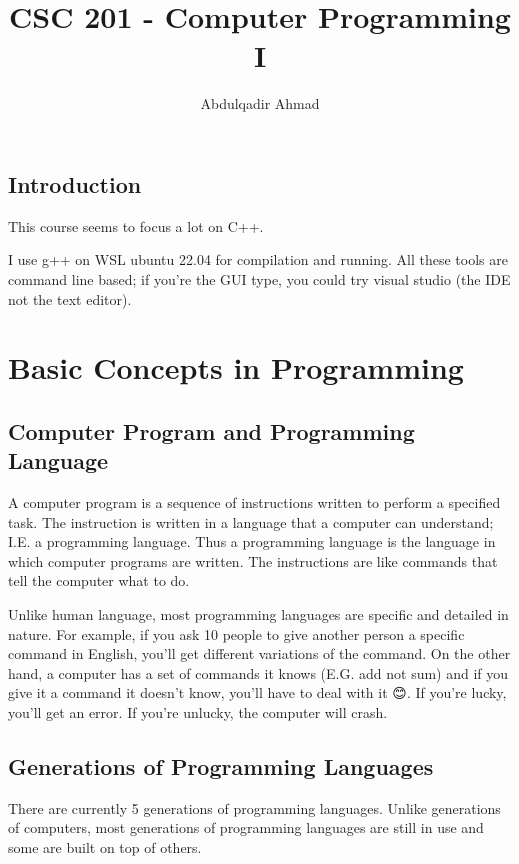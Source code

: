 \documentclass{book}
\title{CSC 201 {-} Computer Programming I}
\author{Abdulqadir Ahmad}
\begin{document}
\maketitle
\tableofcontents

\section{Introduction}
This course seems to focus a lot on C++.

I use g++ on WSL ubuntu 22.04 for compilation and running. All these tools are command line based; if you're the GUI type, you could try visual studio (the IDE not the text editor).

\chapter{Basic Concepts in Programming}

\section{Computer Program and Programming Language}
A computer program is a sequence of instructions written to perform a specified task. The instruction is written in a language that a computer can understand; I.E. a programming language. Thus a programming language is the language in which computer programs are written. The instructions are like commands that tell the computer what to do.

Unlike human language, most programming languages are specific and detailed in nature. For example, if you ask 10 people to give another person a specific command in English, you'll get different variations of the command. On the other hand, a computer has a set of commands it knows (E.G. add not sum) and if you give it a command it doesn't know, you'll have to deal with it 😊. If you're lucky, you'll get an error. If you're unlucky, the computer will crash.

\section{Generations of Programming Languages}
There are currently 5 generations of programming languages. Unlike generations of computers, most generations of programming languages are still in use and some are built on top of others.
\end{document}
